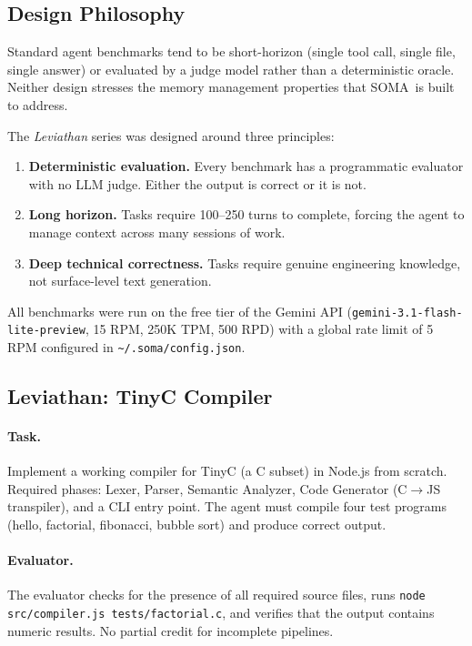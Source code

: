 \documentclass[11pt,a4paper]{article}
\newcommand{\soma}{\textsc{SOMA}}
\begin{document}
\subsection{Design Philosophy}

Standard agent benchmarks tend to be short-horizon (single tool call,
single file, single answer) or evaluated by a judge model rather than
a deterministic oracle.
Neither design stresses the memory management properties that \soma\ is
built to address.

The \textit{Leviathan} series was designed around three principles:
\begin{enumerate}[leftmargin=*]
  \item \textbf{Deterministic evaluation.}
        Every benchmark has a programmatic evaluator with no LLM judge.
        Either the output is correct or it is not.
  \item \textbf{Long horizon.}
        Tasks require 100--250 turns to complete, forcing the agent to
        manage context across many sessions of work.
  \item \textbf{Deep technical correctness.}
        Tasks require genuine engineering knowledge, not surface-level
        text generation.
\end{enumerate}

All benchmarks were run on the free tier of the Gemini API
(\texttt{gemini-3.1-flash-lite-preview}, 15 RPM, 250K TPM, 500 RPD)
with a global rate limit of 5 RPM configured in \texttt{\textasciitilde/.soma/config.json}.

\subsection{Leviathan: TinyC Compiler}

\paragraph{Task.}
Implement a working compiler for TinyC (a C subset) in Node.js from scratch.
Required phases: Lexer, Parser, Semantic Analyzer, Code Generator
(C$\to$JS transpiler), and a CLI entry point.
The agent must compile four test programs (hello, factorial, fibonacci,
bubble sort) and produce correct output.

\paragraph{Evaluator.}
The evaluator checks for the presence of all required source files,
runs \texttt{node src/compiler.js tests/factorial.c}, and verifies
that the output contains numeric results.
No partial credit for incomplete pipelines.
\end{document}
